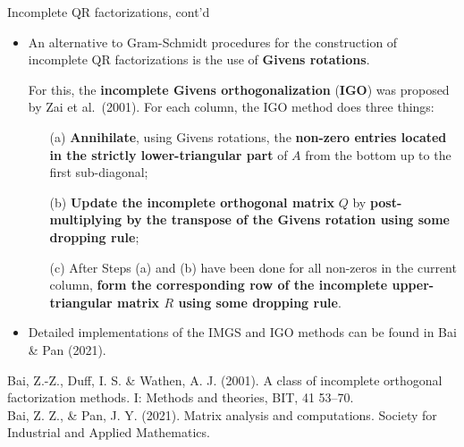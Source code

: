 \documentclass[t,usepdftitle=false]{beamer}
\begin{document}
\begin{frame}{Incomplete QR factorizations, cont’d}
\begin{itemize}
\item An alternative to Gram-Schmidt procedures for the construction of incomplete QR factorizations is the use of \textbf{Givens rotations}.
\item[] For this, the \textbf{incomplete Givens orthogonalization} (\textbf{IGO}) was proposed by Zai et al.~(2001).
For each column, the IGO method does three things:
\begin{itemize}\normalsize
\item[(a)] \textbf{Annihilate}, using Givens rotations, the \textbf{non-zero entries located in the strictly lower-triangular
part} of $A$ from the bottom up to the first sub-diagonal;\vspace{.08cm}
\item[(b)] \textbf{Update the incomplete orthogonal matrix} $Q$ by \textbf{post-multiplying by the transpose of the Givens rotation using some dropping rule};\vspace{.08cm}
\item[(c)] After Steps (a) and (b) have been done for all non-zeros in the current column, \textbf{form the corresponding row of the incomplete upper-triangular matrix $R$ using some dropping rule}.
\end{itemize}
\item Detailed implementations of the IMGS and IGO methods can be found in Bai \& Pan (2021).
\end{itemize}\smallskip
\tiny{Bai, Z.-Z., Duff, I. S. \& Wathen, A. J. (2001). A class of incomplete orthogonal factorization methods. I: Methods and theories, BIT, 41 53–70.}\tinyskip\\
\tiny{Bai, Z. Z., \& Pan, J. Y. (2021). Matrix analysis and computations. Society for Industrial and Applied Mathematics.}
\end{frame}
\end{document}
